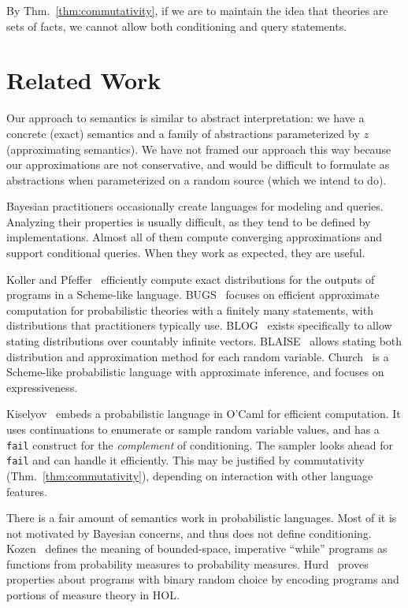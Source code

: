 By Thm.~\ref{thm:commutativity}, if we are to maintain the idea that theories are sets of facts, we cannot allow both conditioning and query statements.

\section{Related Work}

Our approach to semantics is similar to abstract interpretation: we have a concrete (exact) semantics and a family of abstractions parameterized by $z$ (approximating semantics). We have not framed our approach this way because our approximations are not conservative, and would be difficult to formulate as abstractions when parameterized on a random source (which we intend to do).

Bayesian practitioners occasionally create languages for modeling and queries. Analyzing their properties is usually difficult, as they tend to be defined by implementations. Almost all of them compute converging approximations and support conditional queries. When they work as expected, they are useful.

Koller and Pfeffer~\cite{cit:koller-1997aaai-bayes-programs-short} efficiently compute exact distributions for the outputs of programs in a Scheme-like language. BUGS~\cite{cit:winbugs-language-short} focuses on efficient approximate computation for probabilistic theories with a finitely many statements, with distributions that practitioners typically use. BLOG~\cite{cit:blog-language-short} exists specifically to allow stating distributions over countably infinite vectors. BLAISE~\cite{cit:blaise-language} allows stating both distribution and approximation method for each random variable. Church~\cite{cit:church-language-short} is a Scheme-like probabilistic language with approximate inference, and focuses on expressiveness.

Kiselyov~\cite{cit:kiselyov-2008uai-monolingual} embeds a probabilistic language in O'Caml for efficient computation. It uses continuations to enumerate or sample random variable values, and has a \texttt{fail} construct for the \textit{complement} of conditioning. The sampler looks ahead for \texttt{fail} and can handle it efficiently. This may be justified by commutativity (Thm.~\ref{thm:commutativity}), depending on interaction with other language features.

There is a fair amount of semantics work in probabilistic languages. Most of it is not motivated by Bayesian concerns, and thus does not define conditioning. Kozen~\cite{cit:kozen-1979fcs-prob-programs-short} defines the meaning of bounded-space, imperative ``while'' programs as functions from probability measures to probability measures. Hurd~\cite{cit:hurd-2002thesis} proves properties about programs with binary random choice by encoding programs and portions of measure theory in HOL.

